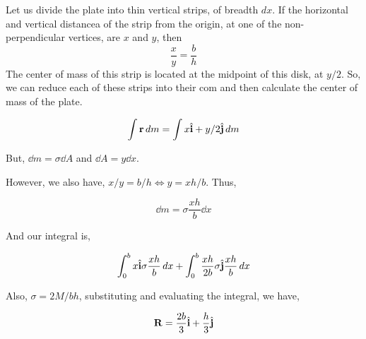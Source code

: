 \begin{marginfigure}
    \centering
\end{marginfigure}

    \begin{soln}
        Let us divide the plate into thin vertical strips, of breadth \(dx\). If the horizontal and vertical distancea of 
        the strip from the origin, at one of the non-perpendicular vertices, are \(x\) and \(y\), then
        \begin{equation*}
            \frac{x}{y} = \frac{b}{h}
        \end{equation*} 
        The center of mass of this strip is located at the midpoint of this disk, at \(y/2\).
        So, we can reduce each of these strips into their com and then calculate the center of mass of the plate.

        \begin{equation*}
            \int \boldsymbol{\mathbf{r}} \mathop{}\!{d}{m} = \int x \hat{\boldsymbol{\mathbf{i}}} + y/2 \hat{\boldsymbol{\mathbf{j}}} \mathop{}\!{d}{m}
        \end{equation*}

        But, \(\dd{m} = \sigma \dd{A}\) and \(\dd{A} = y \dd{x}\). 

        However, we also have, \(x/y = b/h \iff y = xh/b\). Thus, 

        \begin{equation*}
            \dd{m} = \sigma \frac{xh}{b} \dd{x}
        \end{equation*}

        And our integral is,

        \begin{equation*}
            \int_{0}^{b} x \hat{\boldsymbol{\mathbf{i}}} \sigma \frac{xh}{b} \mathop{}\!{d}{x}+ \int_{0}^b \frac{xh}{2b} \sigma \hat{\boldsymbol{\mathbf{j}}} \frac{xh}{b} \mathop{}\!{d}{x}
        \end{equation*}

        Also, \(\sigma = 2M/bh\), substituting and evaluating the integral, we have,

        \begin{equation}
            \boldsymbol{\mathbf{R}} = \frac{2b}{3} \hat{\boldsymbol{\mathbf{i}}} + \frac{h}{3} \hat{\boldsymbol{\mathbf{j}}}
        \end{equation}

    \end{soln}
